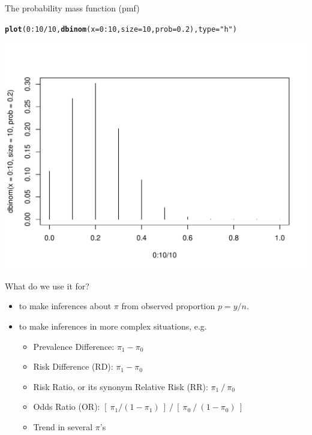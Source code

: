 \documentclass[10pt]{beamer}\usepackage[]{graphicx}\usepackage[]{color}
\makeatletter
\def\maxwidth{ %
  \ifdim\Gin@nat@width>\linewidth
    \linewidth
  \else
    \Gin@nat@width
  \fi
}
\newcommand{\hlnum}[1]{\textcolor[rgb]{0.686,0.059,0.569}{#1}}%
\newcommand{\hlstr}[1]{\textcolor[rgb]{0.192,0.494,0.8}{#1}}%
\newcommand{\hlopt}[1]{\textcolor[rgb]{0,0,0}{#1}}%
\newcommand{\hlstd}[1]{\textcolor[rgb]{0.345,0.345,0.345}{#1}}%
\newcommand{\hlkwc}[1]{\textcolor[rgb]{0.333,0.667,0.333}{#1}}%
\newcommand{\hlkwd}[1]{\textcolor[rgb]{0.737,0.353,0.396}{\textbf{#1}}}%
\newenvironment{kframe}{%
 \def\at@end@of@kframe{}%
 \ifinner\ifhmode%
  \def\at@end@of@kframe{\end{minipage}}%
  \begin{minipage}{\columnwidth}%
 \fi\fi%
 \def\FrameCommand##1{\hskip\@totalleftmargin \hskip-\fboxsep
 \colorbox{shadecolor}{##1}\hskip-\fboxsep
     \hskip-\linewidth \hskip-\@totalleftmargin \hskip\columnwidth}%
 \MakeFramed {\advance\hsize-\width
   \@totalleftmargin\z@ \linewidth\hsize
   \@setminipage}}%
 {\par\unskip\endMakeFramed%
 \at@end@of@kframe}
\newenvironment{knitrout}{}{} %
\makeatother
\begin{document}
\begin{frame}[fragile]{The probability mass function (pmf)}
	
\begin{knitrout}\tiny
{}\color{fgcolor}\begin{kframe}
\begin{alltt}
\hlkwd{plot}\hlstd{(}\hlnum{0}\hlopt{:}\hlnum{10}\hlopt{/}\hlnum{10}\hlstd{,} \hlkwd{dbinom}\hlstd{(}\hlkwc{x} \hlstd{=} \hlnum{0}\hlopt{:}\hlnum{10}\hlstd{,} \hlkwc{size} \hlstd{=} \hlnum{10}\hlstd{,} \hlkwc{prob} \hlstd{=} \hlnum{0.2}\hlstd{),} \hlkwc{type} \hlstd{=} \hlstr{"h"}\hlstd{)}
\end{alltt}
\end{kframe}

{\centering \includegraphics[width=\maxwidth]{figure/unnamed-chunk-4-1} 

}



\end{knitrout}
\end{frame}

\begin{frame}[fragile]{What do we use it for?}
	\small
	\begin{itemize}
		\setlength\itemsep{0.7em}
		\item to make inferences about $\pi$ from  observed  proportion $p= y/n.$ \pause 
		\item to make inferences in more complex situations, e.g. 
		\begin{itemize}
			\setlength\itemsep{0.4em}
			\item Prevalence Difference: $\pi _{1} - \pi _{0}$
			\item Risk Difference (RD): $\pi _{1} - \pi _{0}$
			\item Risk Ratio, or its synonym Relative Risk (RR): $\pi _{1}\:/\:\pi _{0}$
			\item Odds Ratio (OR): $[\: \pi _{1}/(1-\pi _{1})\:] \: / \: [\: \pi _{0}\: / \: (1-\pi _{0}) \: ]$
			\item Trend in several $\pi $'s
		\end{itemize}
	\end{itemize}
\end{frame}
\end{document}
